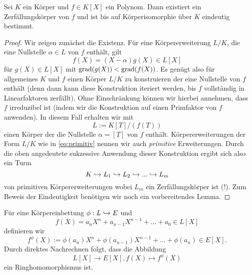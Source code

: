 \documentclass{book}
\begin{document}
\begin{thm}
    \label{thm:zerfexun}
    Sei $K$ ein Körper und $f \in K[X]$ ein Polynom. Dann existiert ein
    Zerfällungskörper von $f$ und ist bis auf Körperisomorphie über $K$
    eindeutig bestimmt.
\end{thm}
\begin{proof}
    Wir zeigen zunächst die Existenz. Für eine Körpererweiterung $L/K$, die eine Nullstelle $\alpha \in L$ von $f$ enthält, gilt
    \[
        f(X) = (X-\alpha) g(X) \in L[X]
    \]
    für $g(X) \in L[X]$ mit $\operatorname{grad}(g(X)) < \operatorname{grad}(f(X))$. Es genügt also für
    allgemeines $K$ und $f$ einen Körper $L/K$ zu konstruieren der eine
    Nullstelle von $f$ enthält (denn dann kann diese Konstruktion iteriert
    werden, bis $f$ vollständig in Linearfaktoren zerfällt). Ohne Einschränkung
    können wir hierbei annehmen, dass $f$ irreduzibel ist (indem wir die
    Konstruktion auf einen Primfaktor von $f$ anwenden). In diesem Fall erhalten wir mit
    \begin{equation}
        \label{eq:primitiv}
        L := K[T]/(f(T))
    \end{equation}
    einen Körper der die Nullstelle $\alpha = [T]$ von $f$ enthält.
    Körpererweiterungen der Form $L/K$ wie in \eqref{eq:primitiv} nennen wir
    auch {\em primitive} Erweiterungen. Durch die oben angedeutete sukzessive
    Anwendung dieser Konstruktion ergibt sich also ein Turm
    \[
        K \hookrightarrow L_1 \hookrightarrow L_2 \hookrightarrow ... \hookrightarrow L_m
    \]
    von primitiven Körpererweiterungen wobei $L_m$ ein Zerfällungskörper ist
    (!). Zum Beweis der Eindeutigkeit benötigen wir noch ein vorbereitendes Lemma.
\end{proof}

Für eine Körpereinbettung $\phi: L \hra E$ und
\[
    f(X) = a_n X^n + a_{n-1} X^{n-1} + ... + a_0 \in L[X]
\]
definieren wir
\begin{equation}
    \label{eq:hochphi}
    f^{\phi}(X) := \phi(a_n) X^n + \phi(a_{n-1}) X^{n-1} + ... + \phi(a_n) \in E[X].
\end{equation}
Durch direktes Nachrechnen folgt, dass die Abbildung
\begin{equation}\label{eq:koeff}
    L[X] \to E[X], f(X) \mapsto f^{\phi}(X)
\end{equation}
ein Ringhomomorphismus ist. 
\end{document}

